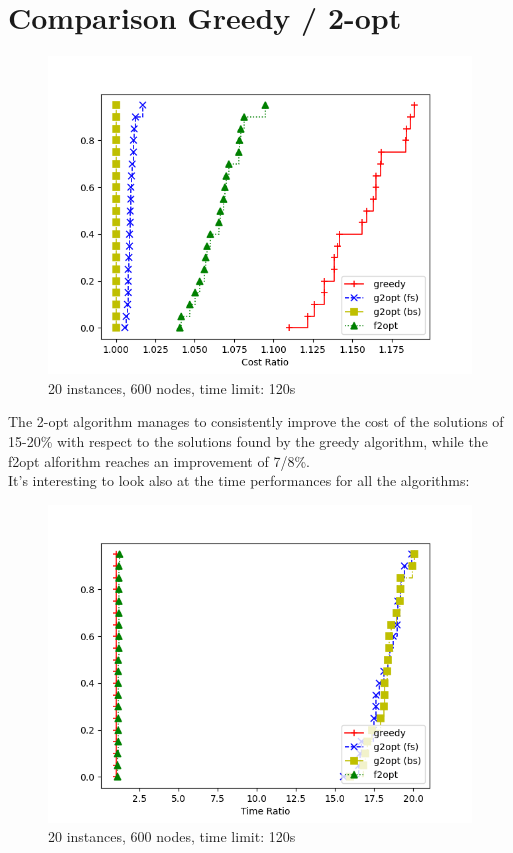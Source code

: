 \section{Comparison Greedy / 2-opt}

\begin{figure}[h]
    \centering
    \includegraphics*[width=.6\textwidth]{../plots/perfprof_heur_costs.png}
    \caption*{20 instances, 600 nodes, time limit: 120s}
\end{figure}

The 2-opt algorithm manages to consistently improve the cost of the solutions of 15-20\% with respect to the solutions found by the greedy algorithm, while the f2opt alforithm reaches an improvement of 7/8\%.\\
It's interesting to look also at the time performances for all the algorithms:
\begin{figure}[h]
    \centering
    \includegraphics*[width=.6\textwidth]{../plots/perfprof_heur_times.png}
    \caption*{20 instances, 600 nodes, time limit: 120s}
\end{figure}